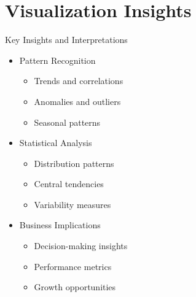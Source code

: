 \documentclass[aspectratio=169]{beamer}
\begin{document}
\section{Visualization Insights}
\begin{frame}{Key Insights and Interpretations}
    \begin{itemize}
        \item Pattern Recognition
        \begin{itemize}
            \item Trends and correlations
            \item Anomalies and outliers
            \item Seasonal patterns
        \end{itemize}
        \item Statistical Analysis
        \begin{itemize}
            \item Distribution patterns
            \item Central tendencies
            \item Variability measures
        \end{itemize}
        \item Business Implications
        \begin{itemize}
            \item Decision-making insights
            \item Performance metrics
            \item Growth opportunities
        \end{itemize}
    \end{itemize}
\end{frame}
\end{document}
